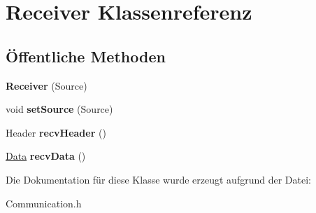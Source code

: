 \hypertarget{classReceiver}{\section{Receiver Klassenreferenz}
\label{classReceiver}
}
\subsection*{Öffentliche Methoden}
\begin{DoxyCompactItemize}
\item 
\hypertarget{classReceiver_a0464fd19299f218b8c207211fbc71d4a}{{\bfseries Receiver} (Source)}\label{classReceiver_a0464fd19299f218b8c207211fbc71d4a}

\item 
\hypertarget{classReceiver_aad4a8442daea23dda4fedfb1bbd50eb6}{void {\bfseries set\-Source} (Source)}\label{classReceiver_aad4a8442daea23dda4fedfb1bbd50eb6}

\item 
\hypertarget{classReceiver_a6fbd0955d9f38741b89b2344a9d8d917}{Header {\bfseries recv\-Header} ()}\label{classReceiver_a6fbd0955d9f38741b89b2344a9d8d917}

\item 
\hypertarget{classReceiver_ac5f244003188d579c26a94cc60b38c31}{\hyperlink{classData}{Data} {\bfseries recv\-Data} ()}\label{classReceiver_ac5f244003188d579c26a94cc60b38c31}

\end{DoxyCompactItemize}


Die Dokumentation für diese Klasse wurde erzeugt aufgrund der Datei\-:\begin{DoxyCompactItemize}
\item 
Communication.\-h\end{DoxyCompactItemize}
